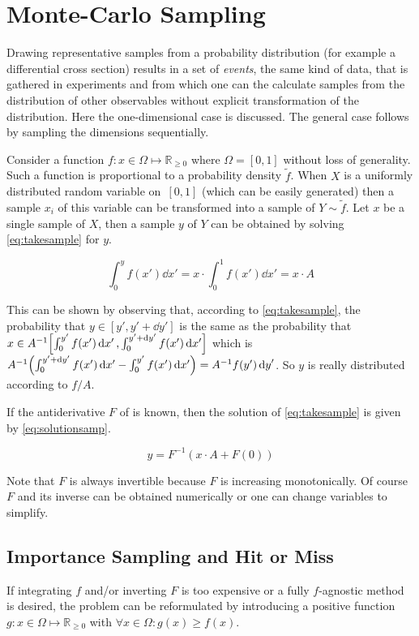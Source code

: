 \section{Monte-Carlo Sampling}%
\label{sec:mcsamp}

Drawing representative samples from a probability distribution (for
example a differential cross section) results in a set of
\emph{events}, the same kind of data, that is gathered in experiments
and from which one can the calculate samples from the distribution of
other observables without explicit transformation of the
distribution. Here the one-dimensional case is discussed. The general
case follows by sampling the dimensions sequentially.

Consider a function \(f\colon x\in\Omega\mapsto\mathbb{R}_{\geq 0}\)
where \(\Omega = [0, 1]\) without loss of generality. Such a function
is proportional to a probability density \(\tilde{f}\). When \(X\) is
a uniformly distributed random variable on~\([0, 1]\) (which can be
easily generated) then a sample \({x_i}\) of this variable can be
transformed into a sample of \(Y\sim\tilde{f}\). Let \(x\) be a single
sample of \(X\), then a sample \(y\) of \(Y\) can be obtained by
solving \cref{eq:takesample} for \(y\).

\begin{equation}
  \label{eq:takesample}
  \int_{0}^{y}f(x')\dd{x'} = x\cdot\int_0^1f(x')\dd{x'} = x\cdot A
\end{equation}

This can be shown by observing that, according
to \cref{eq:takesample}, the probability that
\(y\in[y', y'+\dd{y}']\) is the same as the probability that
\(x\in A^{-1}\qty[\int_{0}^{y'}f(x')\dd{x'},
\int_{0}^{y'+\dd{y}'}f(x')\dd{x'}]\) which is
\(A^{-1}\qty(\int_{0}^{y'+\dd{y}'}f(x')\dd{x'} -
\int_{0}^{y'}f(x')\dd{x'}) = A^{-1} f(y')\dd{y}'\). So \(y\) is really
distributed according to \(f/A\).

If the antiderivative \(F\) of is known, then the solution
of \cref{eq:takesample} is given by \cref{eq:solutionsamp}.

\begin{equation}
  \label{eq:solutionsamp}
  y = F^{-1}(x\cdot A + F(0))
\end{equation}

Note that \(F\) is always invertible because \(F\) is
increasing monotonically. Of course \(F\) and its inverse can be
obtained numerically or one can change variables to simplify.

\subsection{Importance Sampling and Hit or Miss}%
\label{sec:hitmiss}
If integrating \(f\) and/or inverting \(F\) is too expensive or a
fully \(f\)-agnostic method is desired, the problem can be
reformulated by introducing a positive function
\(g\colon x\in\Omega\mapsto\mathbb{R}_{\geq 0}\) with
\(\forall x\in\Omega\colon g(x)\geq f(x)\).

